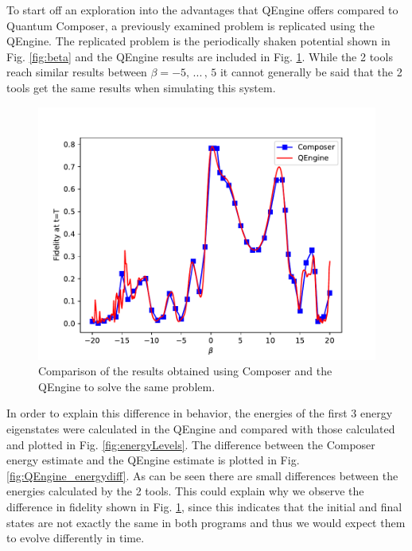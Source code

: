 \documentclass[a4paper, twocolumn]{revtex4-1}
\begin{document}
To start off an exploration into the advantages that QEngine offers compared to Quantum Composer, a previously examined problem is replicated using the QEngine. The replicated problem is the periodically shaken potential shown in Fig. \ref{fig:beta} and the QEngine results are included in Fig. \ref{fig:QEngine_nonOPt}. While the 2 tools reach similar results between $\beta = -5, \, ...\, , \, 5$ it cannot generally be said that the 2 tools get the same results when simulating this system.
\begin{figure}
	\includegraphics[width=\columnwidth]{graphics/qengine/comparison.pdf}
	\caption{Comparison of the results obtained using Composer and the QEngine to solve the same problem.}
	\label{fig:QEngine_nonOPt}
\end{figure}

In order to explain this difference in behavior, the energies of the first 3 energy eigenstates were calculated in the QEngine and compared with those calculated and plotted in Fig. \ref{fig:energyLevels}. The difference between the Composer energy estimate and the QEngine estimate is plotted in Fig. \ref{fig:QEngine_energydiff}. As can be seen there are small differences between the energies calculated by the 2 tools. This could explain why we observe the difference in fidelity shown in Fig. \ref{fig:QEngine_nonOPt}, since this indicates that the initial and final states are not exactly the same in both programs and thus we would expect them to evolve differently in time.\\
\end{document}
